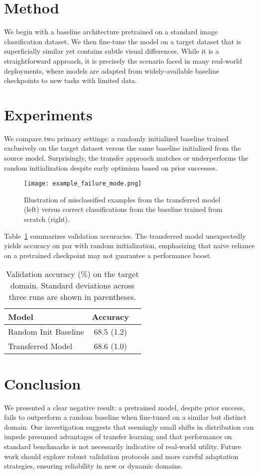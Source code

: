 \documentclass{article}
\begin{document}
\section{Method}
We begin with a baseline architecture pretrained on a standard image classification dataset. We then fine-tune the model on a target dataset that is superficially similar yet contains subtle visual differences. While it is a straightforward approach, it is precisely the scenario faced in many real-world deployments, where models are adapted from widely-available baseline checkpoints to new tasks with limited data.

\section{Experiments}
We compare two primary settings: a randomly initialized baseline trained exclusively on the target dataset versus the same baseline initialized from the source model. Surprisingly, the transfer approach matches or underperforms the random initialization despite early optimism based on prior successes.

\begin{figure}[t]
\centering
\texttt{[image: example\_failure\_mode.png]}
\caption{Illustration of misclassified examples from the transferred model (left) versus correct classifications from the baseline trained from scratch (right).}
\label{fig:failure}
\end{figure}

Table~\ref{tab:results} summarizes validation accuracies. The transferred model unexpectedly yields accuracy on par with random initialization, emphasizing that naive reliance on a pretrained checkpoint may not guarantee a performance boost.

\begin{table}[t]
\centering
\caption{Validation accuracy (\%) on the target domain. Standard deviations across three runs are shown in parentheses.}
\label{tab:results}
\begin{tabular}{lcc}
\toprule
Model & Accuracy \\
\midrule
Random Init Baseline & 68.5 (1.2) \\
Transferred Model & 68.6 (1.0) \\
\bottomrule
\end{tabular}
\end{table}

\section{Conclusion}
We presented a clear negative result: a pretrained model, despite prior success, fails to outperform a random baseline when fine-tuned on a similar but distinct domain. Our investigation suggests that seemingly small shifts in distribution can impede presumed advantages of transfer learning and that performance on standard benchmarks is not necessarily indicative of real-world utility. Future work should explore robust validation protocols and more careful adaptation strategies, ensuring reliability in new or dynamic domains.
\end{document}
